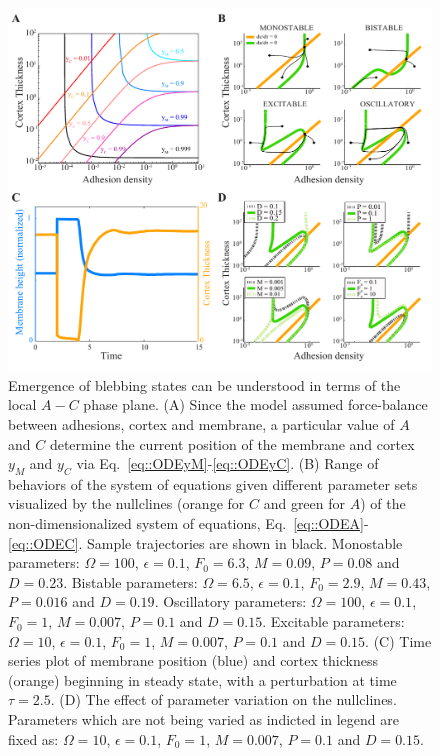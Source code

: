 \begin{figure}
   \begin{center}
   \captionsetup{width=17cm}
     \includegraphics*[width=17cm,center]{Project1/figs/figure3}
      \caption{Emergence of blebbing states can be understood in terms of the local $A-C$ phase plane. (A) Since the model assumed force-balance between adhesions, cortex and membrane, a particular value of $A$ and $C$ determine the current position of the membrane and cortex $y_M$ and $y_C$ via Eq.~\ref{eq::ODEyM}-\ref{eq::ODEyC}. (B) Range of behaviors of the system of equations given different parameter sets visualized by the nullclines (orange for $C$ and green for $A$) of the non-dimensionalized  system of equations, Eq.~\ref{eq::ODEA}-\ref{eq::ODEC}. Sample trajectories are shown in black. Monostable parameters:  $\Omega = 100$, $\epsilon = 0.1$, $F_0 = 6.3$, $M = 0.09$, $P = 0.08$ and $D = 0.23$. Bistable parameters:  $\Omega = 6.5$, $\epsilon = 0.1$, $F_0 = 2.9$, $M = 0.43$, $P = 0.016$ and $D = 0.19$. Oscillatory parameters:  $\Omega = 100$, $\epsilon = 0.1$, $F_0 = 1$, $M = 0.007$, $P = 0.1$ and $D = 0.15$. Excitable parameters:  $\Omega = 10$, $\epsilon = 0.1$, $F_0 = 1$, $M = 0.007$, $P = 0.1$ and $D = 0.15$. (C) Time series plot of membrane position (blue) and cortex thickness (orange) beginning in steady state, with a perturbation at time $\tau = 2.5$. (D) The effect of parameter variation on the nullclines. Parameters which are not being varied as indicted in legend are fixed as: $\Omega = 10$, $\epsilon = 0.1$, $F_0 = 1$, $M = 0.007$, $P = 0.1$ and $D = 0.15$. }
      \label{fig::ODE}
   \end{center}
\end{figure}


